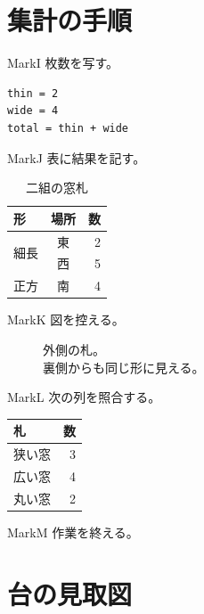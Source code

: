 \documentclass[a4paper,11pt]{ltjsarticle}
\begin{document}
\section{集計の手順}
\noindent MarkI 枚数を写す。
\begin{lstlisting}[caption={窓札を数える}]
thin = 2
wide = 4
total = thin + wide
\end{lstlisting}
\noindent MarkJ 表に結果を記す。
\begin{table}[H]\centering
\caption{二組の窓札}
\begin{tabular}{lcr}\toprule
形 & 場所 & 数 \\ \midrule
\multirow{2}{*}{細長} & 東 & 2 \\ & 西 & 5 \\
正方 & 南 & 4 \\ \bottomrule
\end{tabular}
\end{table}
\noindent MarkK 図を控える。
\begin{figure}[H]\centering
{}
\caption{外側の札。\\裏側からも同じ形に見える。}
\end{figure}
\noindent MarkL 次の列を照合する。
\begin{longtable}{lr}\toprule 札 & 数 \\ \midrule
狭い窓 & 3 \\ 広い窓 & 4 \\ 丸い窓 & 2 \\ \bottomrule
\end{longtable}
\noindent MarkM 作業を終える。
\clearpage
\appendix
\section{台の見取図}
\end{document}
